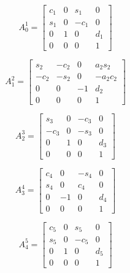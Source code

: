 
\begin{equation}
A_{0}^{1} = \left[\begin{matrix}c_{1} & 0 & s_{1} & 0\\s_{1} & 0 & - c_{1} & 0\\0 & 1 & 0 & d_{1}\\0 & 0 & 0 & 1\end{matrix}\right]
\end{equation}

\begin{equation}
A_{1}^{2} = \left[\begin{matrix}s_{2} & - c_{2} & 0 & a_{2} s_{2}\\- c_{2} & - s_{2} & 0 & - a_{2} c_{2}\\0 & 0 & -1 & d_{2}\\0 & 0 & 0 & 1\end{matrix}\right]
\end{equation}

\begin{equation}
A_{2}^{3} = \left[\begin{matrix}s_{3} & 0 & - c_{3} & 0\\- c_{3} & 0 & - s_{3} & 0\\0 & 1 & 0 & d_{3}\\0 & 0 & 0 & 1\end{matrix}\right]
\end{equation}

\begin{equation}
A_{3}^{4} = \left[\begin{matrix}c_{4} & 0 & - s_{4} & 0\\s_{4} & 0 & c_{4} & 0\\0 & -1 & 0 & d_{4}\\0 & 0 & 0 & 1\end{matrix}\right]
\end{equation}

\begin{equation}
A_{4}^{5} = \left[\begin{matrix}c_{5} & 0 & s_{5} & 0\\s_{5} & 0 & - c_{5} & 0\\0 & 1 & 0 & d_{5}\\0 & 0 & 0 & 1\end{matrix}\right]
\end{equation}

